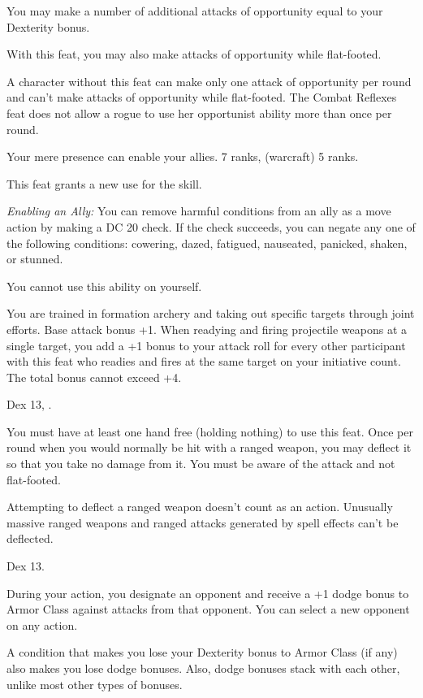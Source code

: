 {}
{}
{You may make a number of additional attacks of opportunity equal to your Dexterity bonus.

With this feat, you may also make attacks of opportunity while flat-footed.}
{A character without this feat can make only one attack of opportunity per round and can't make attacks of opportunity while flat-footed.}
{The Combat Reflexes feat does not allow a rogue to use her opportunist ability more than once per round.}{}

{Your mere presence can enable your allies.}
{ 7 ranks,  (warcraft) 5 ranks.}
{This feat grants a new use for the  skill.

\textit{Enabling an Ally:} You can remove harmful conditions from an ally as a move action by making a DC 20  check. If the check succeeds, you can negate any one of the following conditions: cowering, dazed, fatigued, nauseated, panicked, shaken, or stunned.

You cannot use this ability on yourself.}{}{}

{You are trained in formation archery and taking out specific targets through joint efforts.}
{Base attack bonus +1.}
{When readying and firing projectile weapons at a single target, you add a +1 bonus to your attack roll for every other participant with this feat who readies and fires at the same target on your initiative count. The total bonus cannot exceed +4.}{}{}

{Dex 13, .}
{You must have at least one hand free (holding nothing) to use this feat. Once per round when you would normally be hit with a ranged weapon, you may deflect it so that you take no damage from it. You must be aware of the attack and not flat-footed.

Attempting to deflect a ranged weapon doesn't count as an action. Unusually massive ranged weapons and ranged attacks generated by spell effects can't be deflected.}

{Dex 13.}
{During your action, you designate an opponent and receive a +1 dodge bonus to Armor Class against attacks from that opponent. You can select a new opponent on any action.

A condition that makes you lose your Dexterity bonus to Armor Class (if any) also makes you lose dodge bonuses. Also, dodge bonuses stack with each other, unlike most other types of bonuses.}

